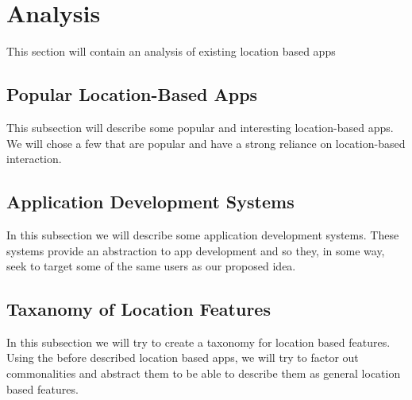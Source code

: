 \section{Analysis} %
\label{sec:analysis}
This section will contain an analysis of existing location based apps

\subsection{Popular Location-Based Apps} %
\label{sub:popular_location_based_apps}
This subsection will describe some popular and interesting location-based apps. We will chose a few that are popular and have a strong reliance on location-based interaction. 

\subsection{Application Development Systems} %
\label{sub:application_development_systems}
In this subsection we will describe some application development systems. These systems provide an abstraction to app development and so they, in some way, seek to target some of the same users as our proposed idea.

\subsection{Taxanomy of Location Features} %
\label{sub:taxanomy_of_location_features}
In this subsection we will try to create a taxonomy for location based features. Using the before described location based apps, we will try to factor out commonalities and abstract them to be able to describe them as general location based features.
